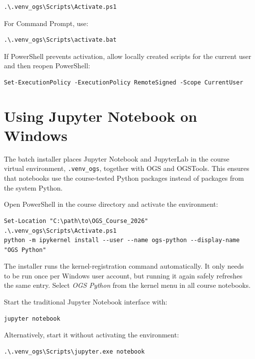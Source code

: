 \documentclass[11pt,a4paper]{tubaf-report}
\begin{document}
\begin{lstlisting}[style=terminal]
.\.venv_ogs\Scripts\Activate.ps1
\end{lstlisting}

For Command Prompt, use:

\begin{lstlisting}[style=terminal]
.\.venv_ogs\Scripts\activate.bat
\end{lstlisting}

If PowerShell prevents activation, allow locally created scripts for the current
user and then reopen PowerShell:

\begin{lstlisting}[style=terminal]
Set-ExecutionPolicy -ExecutionPolicy RemoteSigned -Scope CurrentUser
\end{lstlisting}

\section{Using Jupyter Notebook on Windows}
\label{subsec:windows-jupyter}

The batch installer places Jupyter Notebook and JupyterLab in the course virtual
environment, \texttt{.venv\_ogs}, together with OGS and OGSTools. This ensures that notebooks use
the course-tested Python packages instead of packages from the system Python.

Open PowerShell in the course directory and activate the environment:

\begin{lstlisting}[style=terminal]
Set-Location "C:\path\to\OGS_Course_2026"
.\.venv_ogs\Scripts\Activate.ps1
python -m ipykernel install --user --name ogs-python --display-name "OGS Python"
\end{lstlisting}

The installer runs the kernel-registration command automatically. It only
needs to be run once per Windows user account, but running it again safely
refreshes the same entry. Select \emph{OGS Python} from the kernel menu in all
course notebooks.

Start the traditional Jupyter Notebook interface with:

\begin{lstlisting}[style=terminal]
jupyter notebook
\end{lstlisting}

Alternatively, start it without activating the environment:

\begin{lstlisting}[style=terminal]
.\.venv_ogs\Scripts\jupyter.exe notebook
\end{lstlisting}
\end{document}
